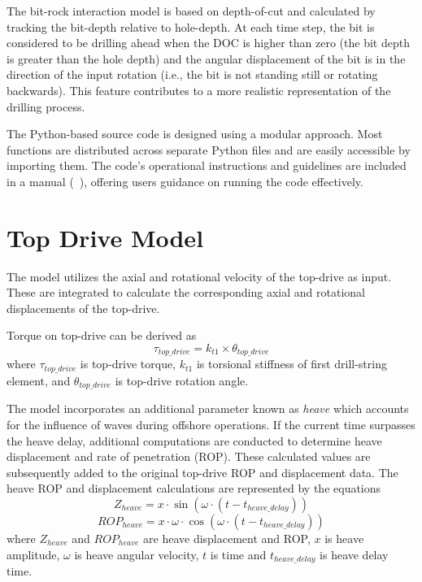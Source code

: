 The bit-rock interaction model is based on depth-of-cut and calculated by tracking the bit-depth relative to hole-depth. At each time step, the bit is considered to be drilling ahead when the DOC is higher than zero (the bit depth is greater than the hole depth) and the angular displacement of the bit is in the direction of the input rotation (i.e., the bit is not standing still or rotating backwards).  This feature contributes to a more realistic representation of the drilling process.

The Python-based source code is designed using a modular approach.  Most functions are distributed across separate Python files and are easily accessible by importing them. The code's operational instructions and guidelines are included in a manual (~\cite{ref:dixit2021a}), offering users guidance on running the code effectively.

\section{Top Drive Model}
The model utilizes the axial and rotational velocity of the top-drive as input. These are integrated to calculate the corresponding axial and rotational displacements of the top-drive.

Torque on top-drive can be derived as
\begin{equation}\label{TorqueEQ}
  \tau_{top\_drive} = k_{t1} \times \theta_{top\_drive}
\end{equation}
where $\tau_{top\_drive}$ is top-drive torque, $k_{t1}$ is torsional stiffness of first drill-string element, and $\theta_{top\_drive}$ is top-drive rotation angle. 

The model incorporates an additional parameter known as \emph{heave} which accounts for the influence of waves during offshore operations. If the current time surpasses the heave delay, additional computations are conducted to determine heave displacement and rate of penetration (ROP). These calculated values are subsequently added to the original top-drive ROP and displacement data. The heave ROP and displacement calculations are represented by the equations
\begin{equation}\label{Z_heave}
  Z_{heave} = x \cdot \sin(\omega \cdot (t - t_{heave\_delay}))
\end{equation}
\begin{equation}\label{ROP_heave}
  ROP_{heave} = x \cdot \omega \cdot \cos(\omega \cdot (t - t_{heave\_delay}))
\end{equation}
where
$Z_{heave}$ and $ROP_{heave}$ are heave displacement and ROP, $x$ is heave amplitude, $\omega$ is heave angular velocity, $t$ is time and $t_{heave\_delay}$ is heave delay time.

